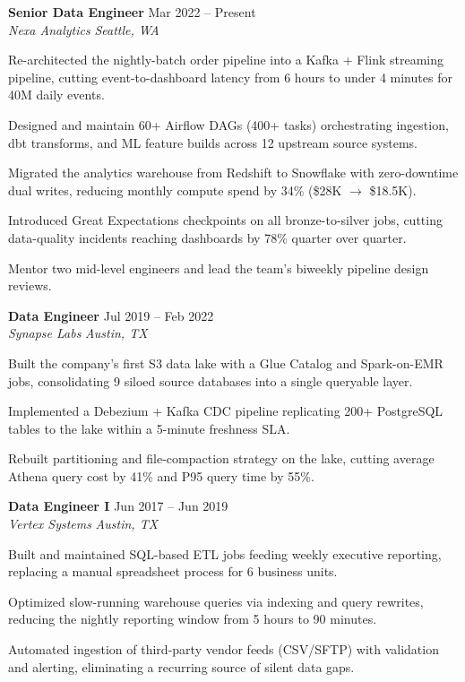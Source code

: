 \documentclass[10pt,letterpaper]{article}
\newcommand{\role}[4]{%
  \vspace{6pt}%
  \textbf{#1} \hfill {\small\color{slateGray}#2}\\
  {\small\itshape\color{pipeTeal}#3} \hfill {\small\itshape\color{slateGray}#4}\\[-1pt]
}
\begin{document}
\role{Senior Data Engineer}{Mar 2022 -- Present}{Nexa Analytics}{Seattle, WA}
\begin{tightitem}
  \item Re-architected the nightly-batch order pipeline into a Kafka + Flink streaming pipeline,
        cutting event-to-dashboard latency from 6 hours to under 4 minutes for 40M daily events.
  \item Designed and maintain 60+ Airflow DAGs (400+ tasks) orchestrating ingestion, dbt
        transforms, and ML feature builds across 12 upstream source systems.
  \item Migrated the analytics warehouse from Redshift to Snowflake with zero-downtime dual
        writes, reducing monthly compute spend by 34\% (\$28K \(\to\) \$18.5K).
  \item Introduced Great Expectations checkpoints on all bronze-to-silver jobs, cutting
        data-quality incidents reaching dashboards by 78\% quarter over quarter.
  \item Mentor two mid-level engineers and lead the team's biweekly pipeline design reviews.
\end{tightitem}

\role{Data Engineer}{Jul 2019 -- Feb 2022}{Synapse Labs}{Austin, TX}
\begin{tightitem}
  \item Built the company's first S3 data lake with a Glue Catalog and Spark-on-EMR jobs,
        consolidating 9 siloed source databases into a single queryable layer.
  \item Implemented a Debezium + Kafka CDC pipeline replicating 200+ PostgreSQL tables to the
        lake within a 5-minute freshness SLA.
  \item Rebuilt partitioning and file-compaction strategy on the lake, cutting average Athena
        query cost by 41\% and P95 query time by 55\%.
\end{tightitem}

\role{Data Engineer I}{Jun 2017 -- Jun 2019}{Vertex Systems}{Austin, TX}
\begin{tightitem}
  \item Built and maintained SQL-based ETL jobs feeding weekly executive reporting, replacing
        a manual spreadsheet process for 6 business units.
  \item Optimized slow-running warehouse queries via indexing and query rewrites, reducing the
        nightly reporting window from 5 hours to 90 minutes.
  \item Automated ingestion of third-party vendor feeds (CSV/SFTP) with validation and alerting,
        eliminating a recurring source of silent data gaps.
\end{tightitem}
\end{document}
